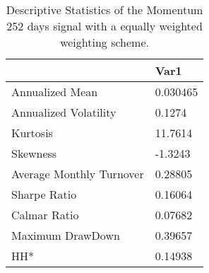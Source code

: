\begin{table}[H]
\centering
\begin{tabular}{ll}
\hline& Var1 \\ 
\hline 
Annualized Mean & 0.030465 \\ 
Annualized Volatility & 0.1274 \\ 
Kurtosis & 11.7614 \\ 
Skewness & -1.3243 \\ 
Average Monthly Turnover & 0.28805 \\ 
Sharpe Ratio & 0.16064 \\ 
Calmar Ratio & 0.07682 \\ 
Maximum DrawDown & 0.39657 \\ 
HH* & 0.14938 \\ 
\hline
\end{tabular}
\caption{Descriptive Statistics of the Momentum 252 days signal with a equally weighted weighting scheme.}
\label{MOM252EW}
\end{table}